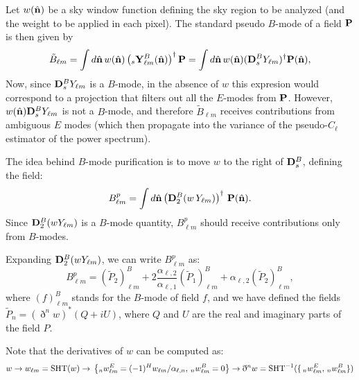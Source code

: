 \documentclass[a4paper,10pt]{article}
\newcommand{\nv}{\hat{\bf n}}
\begin{document}
  Let $w(\nv)$ be a sky window function defining the sky region to be analyzed (and the weight to be applied in each pixel). The standard pseudo $B$-mode of a field ${\bf P}$ is then given by
  \begin{equation}
    \tilde{B}_{\ell m}=\int d\nv\,w(\nv)\left(_s{\bf Y}^{B}_{\ell m}(\nv)\right)^\dag{\bf P}=\int d\nv\,w(\nv)({\bf D}^B_sY_{\ell m})^\dag{\bf P}(\nv),
  \end{equation}
  Now, since ${\bf D}^B_sY_{\ell m}$ is a $B$-mode, in the absence of $w$ this expresion would correspond to a projection that filters out all the $E$-modes from ${\bf P}$. However, $w(\nv){\bf D}^B_sY_{\ell m}$ is not a $B$-mode, and therefore $\tilde{B}_{\ell m}$ receives contributions from ambiguous $E$ modes (which then propagate into the variance of the pseudo-$C_\ell$ estimator of the power spectrum).
  
  The idea behind $B$-mode purification is to move $w$ to the right of ${\bf D}^B_s$, defining the field:
  \begin{equation}
   B^p_{\ell m}=\int d\nv\left({\bf D}^B_2(w\,Y_{\ell m})\right)^\dag\,{\bf P}(\nv).
  \end{equation}
  Since ${\bf D}^B_2(wY_{\ell m})$ is a $B$-mode quantity, $B^p_{\ell m}$ should receive contributions only from $B$-modes.
  
  Expanding ${\bf D}^B_2(wY_{\ell m})$, we can write $B^p_{\ell m}$ as:
  \begin{equation}
    B^p_{\ell m}=
    \left(\tilde{P}_2\right)^B_{\ell m}+
    2\frac{\alpha_{\ell,2}}{\alpha_{\ell,1}}\left(\tilde{P}_1\right)^B_{\ell m}+\alpha_{\ell,2}\left(\tilde{P}_2\right)^B_{\ell m},
  \end{equation}
  where $(f)^B_{\ell m}$ stands for the $B$-mode of field $f$, and we have defined the fields $\tilde{P}_n=(\eth^nw)^*(Q+iU)$, where $Q$ and $U$ are the real and imaginary parts of the field $P$.
  
  Note that the derivatives of $w$ can be computed as:
  \begin{equation}
    w
    \rightarrow w_{\ell m}={\rm SHT}(w)
    \rightarrow\,\left\{_nw^E_{\ell m}=(-1)^Hw_{\ell m}/\alpha_{\ell,n},\,_nw^B_{\ell m}=0\right\}
    \rightarrow \eth^nw={\rm SHT}^{-1}(\{\,_nw^E_{\ell m},\,_nw^B_{\ell m}\})
  \end{equation}
\end{document}
